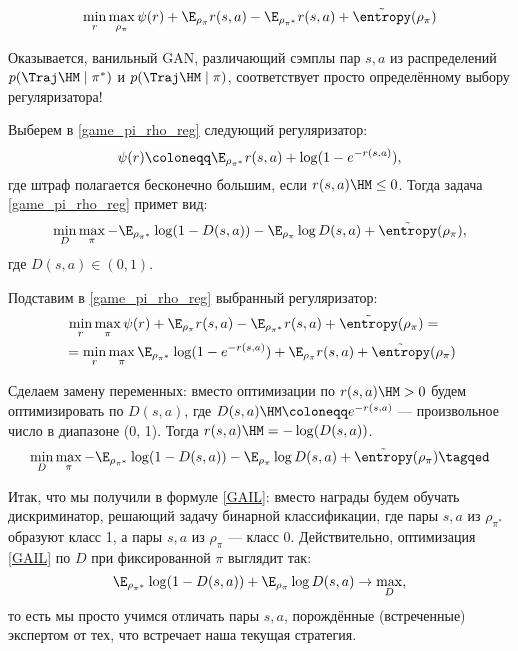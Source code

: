 \begin{equation}\label{game_pi_rho_reg}
\min\limits_{r} \max\limits_{\rho_\pi} \psi(r) + \E_{\rho_{\pi}} r(s, a) - \E_{\rho_{\pi^*}} r(s, a) + \tilde{\entropy}(\rho_\pi)
\end{equation}

Оказывается, ванильный GAN, различающий сэмплы пар $s, a$ из распределений $p(\Traj \HM\mid \pi^*)$ и $p(\Traj \HM\mid \pi)$, соответствует просто определённому выбору регуляризатора!

\begin{theorem}
Выберем в \eqref{game_pi_rho_reg} следующий регуляризатор:
\begin{equation}\label{gail_reg}
\psi(r) \coloneqq \E_{\rho_{\pi^*}} r(s, a) + \log (1 - e^{-r(s, a)}),
\end{equation}
где штраф полагается бесконечно большим, если $r(s, a) \HM\le 0$. Тогда задача \eqref{game_pi_rho_reg} примет вид:
\begin{equation}\label{GAIL}
\min\limits_{D} \max\limits_{\pi} -\E_{\rho_{\pi^*}} \log (1 - D(s, a)) - \E_{\rho_{\pi}} \log D(s, a) + \tilde{\entropy}(\rho_\pi),
\end{equation}
где $D(s, a) \in (0, 1)$.

\beginproof
Подставим в \eqref{game_pi_rho_reg} выбранный регуляризатор:
\begin{align*}
&\, \min\limits_{r} \max\limits_{\pi} \psi(r) + \E_{\rho_\pi} r(s, a) - \E_{\rho_{\pi^*}} r(s, a) + \tilde{\entropy}(\rho_\pi) = \\
&= \min\limits_{r} \max\limits_{\pi} \E_{\rho_{\pi^*}} \log (1 - e^{-r(s, a)}) + \E_{\rho_\pi} r(s, a) + \tilde{\entropy}(\rho_\pi)
\end{align*}

Сделаем замену переменных: вместо оптимизации по $r(s, a) \HM > 0$ будем оптимизировать по $D(s, a)$, где $D(s, a) \HM \coloneqq e^{-r(s, a)}$ --- произвольное число в диапазоне (0, 1). Тогда $r(s, a) \HM= -\log(D(s, a))$.
\begin{equation*}
\min\limits_{D} \max\limits_{\pi} -\E_{\rho_{\pi^*}} \log (1 - D(s, a)) - \E_{\rho_\pi} \log D(s, a) + \tilde{\entropy}(\rho_\pi)   \tagqed
\end{equation*}
\end{theorem}

Итак, что мы получили в формуле \eqref{GAIL}: вместо награды будем обучать дискриминатор, решающий задачу бинарной классификации, где пары $s, a$ из $\rho_{\pi^*}$ образуют класс 1, а пары $s, a$ из $\rho_\pi$ --- класс 0. Действительно, оптимизация \eqref{GAIL} по $D$ при фиксированной $\pi$ выглядит так:
$$\E_{\rho_{\pi^*}} \log (1 - D(s, a)) + \E_{\rho_{\pi}} \log D(s, a) \to \max\limits_{D},$$
то есть мы просто учимся отличать пары $s, a$, порождённые (встреченные) экспертом от тех, что встречает наша текущая стратегия. 

